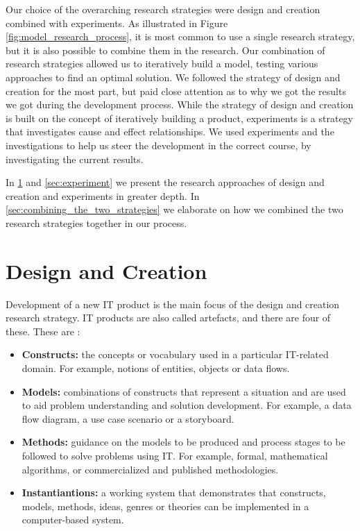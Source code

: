 Our choice of the overarching research strategies were design and creation combined with experiments. As illustrated in Figure \ref{fig:model_research_process}, it is most common to use a single research strategy, but it is also possible to combine them in the research. Our combination of research strategies allowed us to iteratively build a model, testing various approaches to find an optimal solution. We followed the strategy of design and creation for the most part, but paid close attention as to why we got the results we got during the development process. While the strategy of design and creation is built on the concept of iteratively building a product, experiments is a strategy that investigates cause and effect relationships. We used experiments and the investigations to help us steer the development in the correct course, by investigating the current results.

In \ref{sec:design_and_creation} and \ref{sec:experiment} we present the research approaches of design and creation and experiments in greater depth. In \ref{sec:combining_the_two_strategies} we elaborate on how we combined the two research strategies together in our process.


\section{Design and Creation}
\label{sec:design_and_creation}
Development of a new IT product is the main focus of the design and creation research strategy. IT products are also called artefacts, and there are four of these. These are \citep{march1995design, oates2005researching}:

\begin{itemize}
    \item\textbf{Constructs:} the concepts or vocabulary used in a particular IT-related domain. For example, notions of entities, objects or data flows.
    \item\textbf{Models:} combinations of constructs that represent a situation and are used to aid problem understanding and solution development. For example, a data flow diagram, a use case scenario or a storyboard.
    \item\textbf{Methods:} guidance on the models to be produced and process stages to be followed to solve problems using IT. For example, formal, mathematical algorithms, or commercialized and published methodologies.
    \item\textbf{Instantiantions:} a working system that demonstrates that constructs, models, methods, ideas, genres or theories can be implemented in a computer-based system.
\end{itemize}

